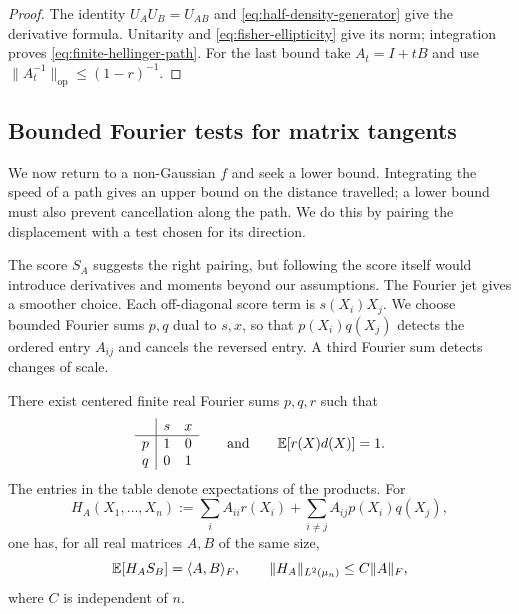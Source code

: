 \begin{proof}
The identity $U_AU_B=U_{AB}$ and \eqref{eq:half-density-generator} give the
derivative formula.  Unitarity and \eqref{eq:fisher-ellipticity} give its
norm; integration proves \eqref{eq:finite-hellinger-path}.  For the last
bound take $A_t=I+tB$ and use
$\|A_t^{-1}\|_{\mathrm{op}}\le(1-r)^{-1}$.
\end{proof}

\subsection{Bounded Fourier tests for matrix tangents}

We now return to a non-Gaussian \(f\) and seek a lower bound. Integrating the
speed of a path gives an upper bound on the distance travelled; a lower
bound must also prevent cancellation along the path. We do this by pairing
the displacement with a test chosen for its direction.

The score \(S_A\) suggests the right pairing, but following the score itself
would introduce derivatives and moments beyond our assumptions. The
Fourier jet gives a smoother choice. Each off-diagonal score term is
\(s(X_i)X_j\). We choose bounded Fourier sums \(p,q\) dual to \(s,x\), so
that \(p(X_i)q(X_j)\) detects the ordered entry \(A_{ij}\) and cancels the
reversed entry. A third Fourier sum detects changes of scale.

\begin{lemma}
\label{lem:fourier-dual-moments}
There exist centered finite real Fourier sums $p,q,r$ such that
\begin{equation}
 \begin{array}{c|cc}
       &s&x\\ \hline
 p     &1&0\\
 q     &0&1
 \end{array}
 \qquad\text{and}\qquad \mathbb E[r(X)d(X)]=1.
\end{equation}
The entries in the table denote expectations of the products.
For
\begin{equation}
 H_A(X_1,\ldots,X_n):=\sum_i A_{ii}r(X_i)
              +\sum_{i\ne j}A_{ij}p(X_i)q(X_j),
 \label{eq:fourier-functions}
\end{equation}
one has, for all real matrices $A,B$ of the same size,
\begin{equation}
 \mathbb E[H_AS_B]=\langle A,B\rangle_F,
 \qquad \|H_A\|_{L^2(\mu_n)}\le C\|A\|_F,
 \label{eq:matched-fourier-pairing}
\end{equation}
where $C$ is independent of $n$.
\end{lemma}

